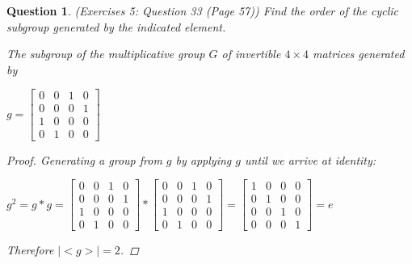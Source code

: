 \documentclass{article}
\newtheorem{ques}{Question}
\begin{document}
\begin{ques} (Exercises 5: Question 33 (Page 57))
Find the order of the cyclic subgroup generated by the indicated element.

The subgroup of the multiplicative group $G$ of invertible $4 \times 4$ matrices generated by 

$g = 
\begin{bmatrix}
0 & 0 & 1 & 0 \\
0 & 0 & 0 & 1 \\
1 & 0 & 0 & 0 \\
0 & 1 & 0 & 0 
\end{bmatrix}  $	
	
	\begin{proof}		
		Generating a group from $g$ by applying $g$ until we arrive at identity:
		
		
		$g^2 = g * g = 
		\begin{bmatrix}
		0 & 0 & 1 & 0 \\
		0 & 0 & 0 & 1 \\
		1 & 0 & 0 & 0 \\
		0 & 1 & 0 & 0 
		\end{bmatrix} * 
		\begin{bmatrix}
		0 & 0 & 1 & 0 \\
		0 & 0 & 0 & 1 \\
		1 & 0 & 0 & 0 \\
		0 & 1 & 0 & 0 
		\end{bmatrix} = 
		\begin{bmatrix}
		1 & 0 & 0 & 0 \\
		0 & 1 & 0 & 0 \\
		0 & 0 & 1 & 0 \\
		0 & 0 & 0 & 1 
		\end{bmatrix} = e$
		
		Therefore $\mid <g>\mid = 2$.
	\end{proof}
\end{ques}
\end{document}
